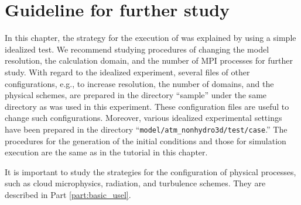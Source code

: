 \section{Guideline for further study} \label{sec:ideal_exp_last}

In this chapter,
the strategy for the execution of \scaledg was explained by using a simple idealized test. 
We recommend studying procedures of changing the model resolution, 
the calculation domain, and the number of MPI processes for further study. 
With regard to the idealized experiment, several files of other configurations, 
e.g., to increase resolution, the number of domains, and the physical schemes, are prepared in the directory ``sample'' under the same directory as was used in this experiment. 
These configuration files are useful to change such configurations.  
Moreover, various idealized experimental settings  have been prepared in the directory ``\verb|model/atm_nonhydro3d/test/case|.'' 
The procedures for the generation of the initial conditions and those for simulation execution are the same as in the tutorial in this chapter.

It is important to study the strategies for the configuration of physical processes, such as cloud microphysics, radiation, and turbulence schemes. 
They are described in Part \ref{part:basic_usel}.

